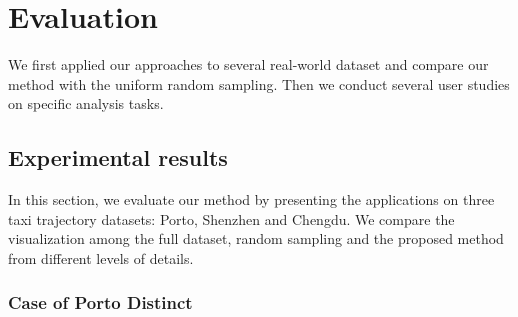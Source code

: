 \section{Evaluation}
We first applied our approaches to several real-world dataset and compare our method with the uniform random sampling. Then we conduct several user studies on specific analysis tasks. 
\subsection{Experimental results}
In this section, we evaluate our method by presenting the applications on three taxi trajectory datasets: Porto, Shenzhen and Chengdu. We compare the visualization among the full dataset, random sampling and the proposed method from different levels of details. 
\subsubsection{Case of Porto Distinct}
